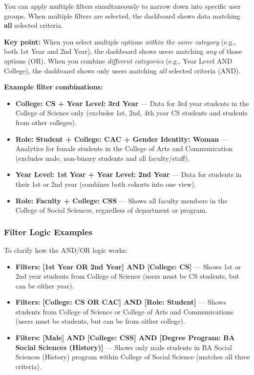 \documentclass[12pt, a4paper]{article}
\begin{document}
You can apply multiple filters simultaneously to narrow down into specific user groups. When multiple filters are selected, the dashboard shows data matching \textbf{all} selected criteria.

\textbf{Key point:} When you select multiple options \textit{within the same category} (e.g., both 1st Year and 2nd Year), the dashboard shows users matching \textit{any} of those options (OR). When you combine \textit{different categories} (e.g., Year Level AND College), the dashboard shows only users matching \textit{all} selected criteria (AND).

\textbf{Example filter combinations:}

\begin{itemize}[leftmargin=1.5em]
  \item \textbf{College: CS + Year Level: 3rd Year} — Data for 3rd year students in the College of Science only (excludes 1st, 2nd, 4th year CS students and students from other colleges).
  \item \textbf{Role: Student + College: CAC + Gender Identity: Woman} — Analytics for female students in the College of Arts and Communication (excludes male, non-binary students and all faculty/staff).
  \item \textbf{Year Level: 1st Year + Year Level: 2nd Year} — Data for students in their 1st or 2nd year (combines both cohorts into one view).
  \item \textbf{Role: Faculty + College: CSS} — Shows all faculty members in the College of Social Sciences, regardless of department or program.
\end{itemize}

\subsubsection{Filter Logic Examples}

To clarify how the AND/OR logic works:

\begin{itemize}[leftmargin=1.5em]
  \item \textbf{Filters: [1st Year OR 2nd Year] AND [College: CS]} — Shows 1st or 2nd year students from College of Science (users must be CS students, but can be either year).
  \item \textbf{Filters: [College: CS OR CAC] AND [Role: Student]} — Shows students from College of Science or College of Arts and Communications (users must be students, but can be from either college).
  \item \textbf{Filters: [Male] AND [College: CSS] AND [Degree Program: BA Social Sciences (History)]} — Shows only male students in BA Social Sciences (History) program within College of Social Science (matches all three criteria).
\end{itemize}
\end{document}

